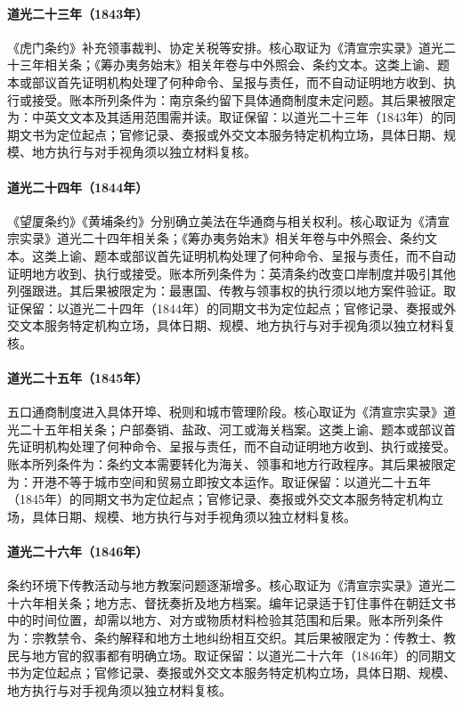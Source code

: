 \hypertarget{ledger:EQ-1843-BOGUE-TREATY}{}\paragraph{道光二十三年（1843年）}《虎门条约》补充领事裁判、协定关税等安排。核心取证为《清宣宗实录》道光二十三年相关条；《筹办夷务始末》相关年卷与中外照会、条约文本。这类上谕、题本或部议首先证明机构处理了何种命令、呈报与责任，而不自动证明地方收到、执行或接受。账本所列条件为：南京条约留下具体通商制度未定问题。其后果被限定为：中英文文本及其适用范围需并读。取证保留：以道光二十三年（1843年）的同期文书为定位起点；官修记录、奏报或外交文本服务特定机构立场，具体日期、规模、地方执行与对手视角须以独立材料复核。
\hypertarget{ledger:EQ-1844-WANGXIA-WHAMPOA-TREATIES}{}\paragraph{道光二十四年（1844年）}《望厦条约》《黄埔条约》分别确立美法在华通商与相关权利。核心取证为《清宣宗实录》道光二十四年相关条；《筹办夷务始末》相关年卷与中外照会、条约文本。这类上谕、题本或部议首先证明机构处理了何种命令、呈报与责任，而不自动证明地方收到、执行或接受。账本所列条件为：英清条约改变口岸制度并吸引其他列强跟进。其后果被限定为：最惠国、传教与领事权的执行须以地方案件验证。取证保留：以道光二十四年（1844年）的同期文书为定位起点；官修记录、奏报或外交文本服务特定机构立场，具体日期、规模、地方执行与对手视角须以独立材料复核。
\hypertarget{ledger:EQ-1845-TREATY-PORT-OPENING}{}\paragraph{道光二十五年（1845年）}五口通商制度进入具体开埠、税则和城市管理阶段。核心取证为《清宣宗实录》道光二十五年相关条；户部奏销、盐政、河工或海关档案。这类上谕、题本或部议首先证明机构处理了何种命令、呈报与责任，而不自动证明地方收到、执行或接受。账本所列条件为：条约文本需要转化为海关、领事和地方行政程序。其后果被限定为：开港不等于城市空间和贸易立即按文本运作。取证保留：以道光二十五年（1845年）的同期文书为定位起点；官修记录、奏报或外交文本服务特定机构立场，具体日期、规模、地方执行与对手视角须以独立材料复核。
\hypertarget{ledger:EQ-1846-MISSIONARY-RETURN}{}\paragraph{道光二十六年（1846年）}条约环境下传教活动与地方教案问题逐渐增多。核心取证为《清宣宗实录》道光二十六年相关条；地方志、督抚奏折及地方档案。编年记录适于钉住事件在朝廷文书中的时间位置，却需以地方、对方或物质材料检验其范围和后果。账本所列条件为：宗教禁令、条约解释和地方土地纠纷相互交织。其后果被限定为：传教士、教民与地方官的叙事都有明确立场。取证保留：以道光二十六年（1846年）的同期文书为定位起点；官修记录、奏报或外交文本服务特定机构立场，具体日期、规模、地方执行与对手视角须以独立材料复核。

